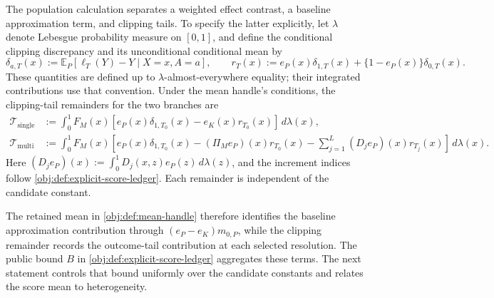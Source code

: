 \documentclass[11pt]{article}
\begin{document}
The population calculation separates a weighted effect contrast, a baseline approximation term, and clipping tails. To specify the latter explicitly, let \(\lambda\) denote Lebesgue probability measure on \([0,1]\), and define the conditional clipping discrepancy and its unconditional conditional mean by
\[
\delta_{a,T}(x)
:=\mathbb E_P[\ell_T(Y)-Y\mid X=x,A=a],
\qquad
r_T(x):=e_P(x)\delta_{1,T}(x)
+\{1-e_P(x)\}\delta_{0,T}(x).
\]
These quantities are defined up to \(\lambda\)-almost-everywhere equality; their integrated contributions use that convention. Under the mean handle's conditions, the clipping-tail remainders for the two branches are
\[
\begin{aligned}
\mathcal T_{\mathrm{single}}
&:=\int_0^1 F_M(x)
\left[e_P(x)\delta_{1,T_0}(x)
-e_K(x)r_{T_0}(x)\right]\,d\lambda(x),\\
\mathcal T_{\mathrm{multi}}
&:=\int_0^1 F_M(x)
\left[
e_P(x)\delta_{1,T_0}(x)
-(\Pi_Me_P)(x)r_{T_0}(x)
-\sum_{j=1}^{L}(D_je_P)(x)r_{T_j}(x)
\right]\,d\lambda(x).
\end{aligned}
\]
Here \((D_je_P)(x):=\int_0^1D_j(x,z)e_P(z)\,d\lambda(z)\), and the increment indices follow \cref{obj:def:explicit-score-ledger}. Each remainder is independent of the candidate constant.

The retained mean in \cref{obj:def:mean-handle} therefore identifies the baseline approximation contribution through \((e_P-e_K)m_{0,P}\), while the clipping remainder records the outcome-tail contribution at each selected resolution. The public bound \(B\) in \cref{obj:def:explicit-score-ledger} aggregates these terms. The next statement controls that bound uniformly over the candidate constants and relates the score mean to heterogeneity.
\end{document}

